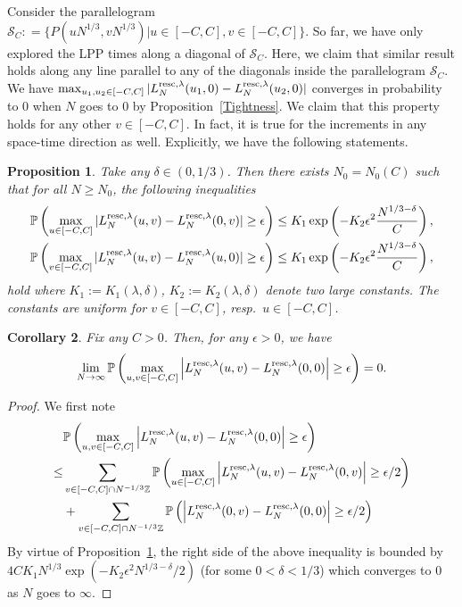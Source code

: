 \documentclass[12pt,a4paper]{article}
\numberwithin{equation}{section}
\newcommand{\Pb}{\mathbb{P}}
\newcommand{\Z}{\mathbb{Z}}
\newtheorem{prop}{Proposition}[section]
\newtheorem{cor}[prop]{Corollary}
\begin{document}
Consider the parallelogram $\mathcal{S}_{C}: =\{P(uN^{1/3},vN^{1/3})|u\in [-C,C], v\in [-C,C]\}$. So far, we have only explored the LPP times along a diagonal of $\mathcal{S}_C$. Here, we claim that similar result holds along any line parallel to any of the diagonals inside the parallelogram $\mathcal{S}_C$.
We have $\max_{u_1,u_2\in [-C,C]}|L_N^{{\rm resc},\lambda}(u_1,0)-L_N^{{\rm resc},\lambda}(u_2,0)|$ converges in probability to $0$ when $N$ goes to $0$ by Proposition~\ref{Tightness}. We claim that this property holds for any other $v\in [-C,C]$. In fact, it is true for the increments in any space-time direction as well. Explicitly, we have the following statements.
 \begin{prop}\label{ConcBoundOnMaximum}
Take any $\delta\in (0,1/3)$. Then there exists $N_0=N_0(C)$ such that for all $N\geq N_0$, the following inequalities
 \begin{align}
 \Pb\left(\max_{u\in [-C,C]}|L_N^{{\rm resc},\lambda}(u,v)-L_N^{{\rm resc},\lambda}(0,v)|\geq \epsilon \right) \leq K_1\exp\left( - K_2\epsilon^2 \frac{N^{1/3-\delta}}{C}\right),\label{eq:ExpectedResult1}\\
 \Pb\left(\max_{v\in [-C,C]}|L_N^{{\rm resc},\lambda}(u,v)-L_N^{{\rm resc},\lambda}(u,0)|\geq \epsilon\right) \leq K_1\exp\left( - K_2\epsilon^2 \frac{N^{1/3-\delta}}{C}\right),\label{eq:ExpectedResult2}
\end{align}
hold where $K_1:=K_1(\lambda,\delta)$, $K_2:=K_2(\lambda,\delta)$ denote two large constants. The constants are uniform for $v\in [-C,C]$, resp.\ $u\in [-C,C]$.
\end{prop}

\begin{cor}\label{UsefulCorBis}
Fix any $C>0$. Then, for any $\epsilon>0$, we have
\begin{align}
\lim_{N\to \infty}\Pb\left(\max_{u,v\in [-C,C]}\left|L_N^{{\rm resc},\lambda}(u,v)-L_N^{{\rm resc},\lambda}(0,0)\right|\geq \epsilon\right) =0.
\end{align}
\end{cor}
\begin{proof}
We first note
\begin{equation}
\begin{aligned}
&\Pb\left(\max_{u,v\in [-C,C]}\left|L_N^{{\rm resc},\lambda}(u,v)-L_N^{{\rm resc},\lambda}(0,0)\right|\geq \epsilon\right)\\
\leq &\sum_{v\in [-C,C]\cap N^{-1/3}\Z} \Pb\left(\max_{u\in [-C,C]}\left|L_N^{{\rm resc},\lambda}(u,v)-L_N^{{\rm resc},\lambda}(0,v)\right|\geq \epsilon/2\right)\\
&+\sum_{v\in [-C,C]\cap N^{-1/3}\Z} \Pb\left(\left|L_N^{{\rm resc},\lambda}(0,v)-L_N^{{\rm resc},\lambda}(0,0)\right|\geq \epsilon/2\right)\\
\end{aligned}
\end{equation}
By virtue of Proposition~\ref{ConcBoundOnMaximum}, the right side of the above inequality is bounded by $4CK_1N^{1/3}\exp(-K_2\epsilon^2 N^{1/3-\delta}/2)$ (for some $0<\delta<1/3$) which converges to $0$ as $N$ goes to $\infty$.
\end{proof}
\end{document}
